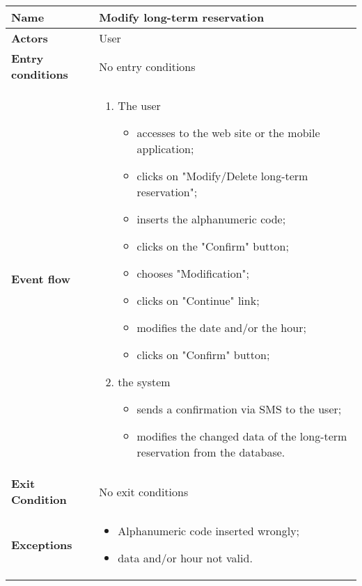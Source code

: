 \vspace{20pt}
\noindent
\begin{tabular}{l l}
 \textbf {Name} & Modify long-term reservation  \\ \hline
 \textbf{Actors} & User \\ \hline
 \textbf{Entry conditions} & No entry conditions \\ \hline
 \textbf{Event flow} & 
 \parbox{0.9\textwidth}{
 \begin{enumerate}
 \item The user
 \begin{itemize}
 \item accesses to the web site or the mobile application;
 \item clicks on "Modify/Delete long-term reservation";
 \item inserts the alphanumeric code;
 \item clicks on the "Confirm" button;
 \item chooses "Modification";
 \item clicks on "Continue" link;
 \item modifies the date and/or the hour;
 \item clicks on "Confirm" button;
 \end{itemize}
 \item the system
 \begin{itemize}
 \item sends a confirmation via SMS to the user;
 \item modifies the changed data of the long-term reservation from the database.
 \end{itemize}
 \end{enumerate}
 } \\ \hline
 \textbf{Exit Condition} & No exit conditions \\ \hline
 \textbf{Exceptions} &  \parbox{0.9\textwidth}{ 
 \begin{itemize}
 \item Alphanumeric code inserted wrongly;
 \item data and/or hour not valid.
 \end{itemize}
 }
\end{tabular}



